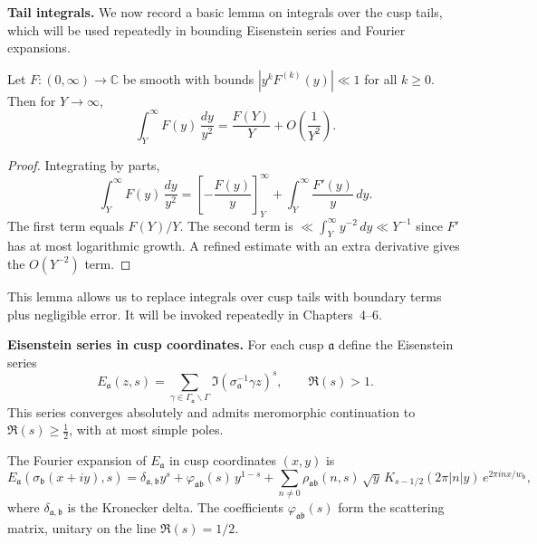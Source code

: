 \medskip

\noindent\textbf{Tail integrals.}
We now record a basic lemma on integrals over the cusp tails,
which will be used repeatedly in bounding Eisenstein series and Fourier expansions.

\begin{lemma}
Let $F:(0,\infty)\to\mathbb{C}$ be smooth with bounds $|y^{k} F^{(k)}(y)| \ll 1$ for all $k\ge0$.
Then for $Y\to\infty$,
\[
  \int_{Y}^{\infty} F(y)\,\frac{dy}{y^{2}}
  = \frac{F(Y)}{Y} + O\!\left(\frac{1}{Y^{2}}\right).
\]
\end{lemma}

\begin{proof}
Integrating by parts,
\[
  \int_{Y}^{\infty} F(y)\,\frac{dy}{y^{2}}
  = \left[-\frac{F(y)}{y}\right]_{Y}^{\infty} + \int_{Y}^{\infty} \frac{F'(y)}{y}\,dy.
\]
The first term equals $F(Y)/Y$.
The second term is $\ll \int_{Y}^{\infty} y^{-2}\,dy \ll Y^{-1}$ since $F'$ has at most logarithmic growth.
A refined estimate with an extra derivative gives the $O(Y^{-2})$ term.
\end{proof}

\medskip

\noindent
This lemma allows us to replace integrals over cusp tails with boundary terms plus negligible error.
It will be invoked repeatedly in Chapters~4–6.



\noindent\textbf{Eisenstein series in cusp coordinates.}
For each cusp $\mathfrak{a}$ define the Eisenstein series
\[
  E_{\mathfrak{a}}(z,s) = \sum_{\gamma\in \Gamma_{\mathfrak{a}}\backslash\Gamma}
  \Im(\sigma_{\mathfrak{a}}^{-1}\gamma z)^{s}, \qquad \Re(s)>1.
\]
This series converges absolutely and admits meromorphic continuation to $\Re(s)\ge \tfrac12$,
with at most simple poles.

\medskip

\noindent
The Fourier expansion of $E_{\mathfrak{a}}$ in cusp coordinates $(x,y)$ is
\[
  E_{\mathfrak{a}}(\sigma_{\mathfrak{b}}(x+iy),s)
  = \delta_{\mathfrak{a},\mathfrak{b}} y^{s}
  + \varphi_{\mathfrak{a}\mathfrak{b}}(s)\, y^{1-s}
  + \sum_{n\neq 0} \rho_{\mathfrak{a}\mathfrak{b}}(n,s)\, \sqrt{y}\,K_{s-1/2}(2\pi|n|y)\,e^{2\pi i n x/w_{\mathfrak{b}}},
\]
where $\delta_{\mathfrak{a},\mathfrak{b}}$ is the Kronecker delta.
The coefficients $\varphi_{\mathfrak{a}\mathfrak{b}}(s)$ form the scattering matrix,
unitary on the line $\Re(s)=1/2$.


